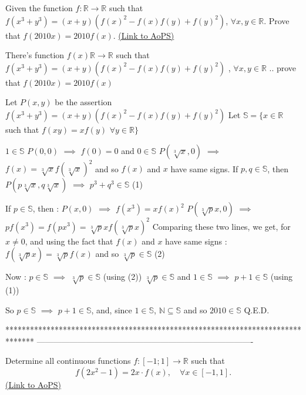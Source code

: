 \begin{problem}
	Given the function $ f : \mathbb{R} \rightarrow \mathbb{R}$ such that $ f(x^3 + y^3) = (x+y)(f(x)^2 - f(x)f(y) + f(y)^2)$, $ \forall x,y \in \mathbb{R}$. Prove that  $ f(2010x)=2010f(x)$.
	\flushright \href{https://artofproblemsolving.com/community/c6h301934}{(Link to AoPS)}
\end{problem}



\begin{solution}
	\begin{tcolorbox}There's function $ f(x) \mathbb{R} \rightarrow \mathbb{R}$ such that $ f(x^3 + y^3) = (x + y)(f(x)^2 - f(x)f(y) + f(y)^2)$ , $ \forall x,y \in \mathbb{R}$ .. prove that  $ f(2010x) = 2010f(x)$\end{tcolorbox}
Let $ P(x,y)$ be the assertion $ f(x^3+y^3)=(x+y)(f(x)^2-f(x)f(y)+f(y)^2)$
Let $ \mathbb S=\{x\in\mathbb R$ such that $ f(xy)=xf(y)$ $ \forall y\in\mathbb R\}$

$ 1\in\mathbb S$
$ P(0,0)$ $ \implies$ $ f(0)=0$ and $ 0\in\mathbb S$
$ P(\sqrt[3]x,0)$ $ \implies$ $ f(x)=\sqrt[3]xf(\sqrt[3]x)^2$ and so $ f(x)$ and $ x$ have same signs.
If $ p,q\in\mathbb S$, then $ P(p\sqrt[3]x,q\sqrt[3]x)$ $ \implies$ $ p^3+q^3\in\mathbb S$ (1)

If $ p\in\mathbb S$, then :
$ P(x,0)$ $ \implies$ $ f(x^3)=xf(x)^2$
$ P(\sqrt[3]px,0)$ $ \implies$ $ pf(x^3)=f(px^3)=\sqrt[3]pxf(\sqrt[3]px)^2$
Comparing these two lines, we get, for $ x\neq 0$, and using the fact that $ f(x)$ and $ x$ have same signs  : $ f(\sqrt[3]px)=\sqrt[3]pf(x)$ and so $ \sqrt[3]p\in\mathbb S$ (2)

Now :
$ p\in\mathbb S$ $ \implies$ $ \sqrt[3]p\in\mathbb S$ (using (2))
$ \sqrt[3]p\in\mathbb S$ and $ 1\in\mathbb S$ $ \implies$ $ p+1\in\mathbb S$ (using (1))

So $ p\in\mathbb S$ $ \implies$ $ p+1\in\mathbb S$, and, since $ 1\in\mathbb S$, $ \mathbb N\subseteq\mathbb S$ and so $ 2010\in\mathbb S$
Q.E.D.
\end{solution}
*******************************************************************************
-------------------------------------------------------------------------------

\begin{problem}
	Determine all continuous functions $ f: [-1;1] \to \mathbb R$ such that \[ f(2x^2-1)=2x \cdot f(x), \quad \forall x \in [-1,1].\]
	\flushright \href{https://artofproblemsolving.com/community/c6h302132}{(Link to AoPS)}
\end{problem}



